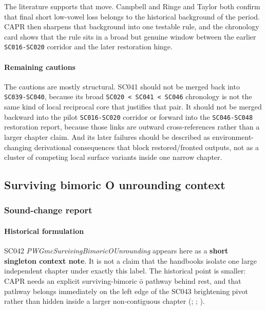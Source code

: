 \documentclass[
  british,
  a4paper,
]{article}
\begin{document}
The literature supports that move. Campbell and Ringe and Taylor both
confirm that final short low-vowel loss belongs to the historical
background of the period. CAPR then sharpens that background into one
testable rule, and the chronology card shows that the rule sits in a
broad but genuine window between the earlier \texttt{SC016-SC020}
corridor and the later restoration hinge.

\paragraph{Remaining cautions}\label{remaining-cautions-25}

The cautions are mostly structural. SC041 should not be merged back into
\texttt{SC039-SC040}, because its broad
\texttt{SC020\ \textless{}\ SC041\ \textless{}\ SC046} chronology is not
the same kind of local reciprocal core that justifies that pair. It
should not be merged backward into the pilot \texttt{SC016-SC020}
corridor or forward into the \texttt{SC046-SC048} restoration report,
because those links are outward cross-references rather than a larger
chapter claim. And its later failures should be described as
environment-changing derivational consequences that block
restored/fronted outputs, not as a cluster of competing local surface
variants inside one narrow chapter.

\subsection{Surviving bimoric O unrounding
context}\label{surviving-bimoric-o-unrounding-context}

\subsubsection{Sound-change report}\label{sound-change-report-26}

\paragraph{Historical formulation}\label{historical-formulation-26}

SC042 \emph{PWGmcSurvivingBimoricOUnrounding} appears here as a
\textbf{short singleton context note}. It is not a claim that the
handbooks isolate one large independent chapter under exactly this
label. The historical point is smaller: CAPR needs an explicit
surviving-bimoric ō pathway behind rest, and that pathway belongs
immediately on the left edge of the SC043 brightening pivot rather than
hidden inside a larger non-contiguous chapter
(;
;
).
\end{document}
